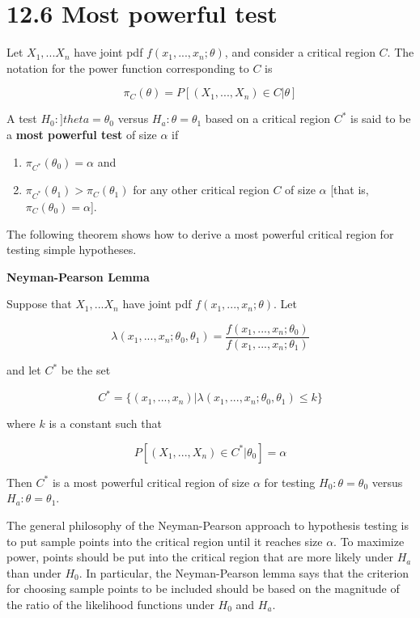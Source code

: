 \documentclass[]{book}
\begin{document}
\hypertarget{most-powerful-test}{%
\section{12.6 Most powerful test}\label{most-powerful-test}}

Let \(X_1,...X_n\) have joint pdf \(f(x_1,...,x_n; \theta)\), and consider a critical region \(C\). The notation for the power function corresponding to \(C\) is

\[\pi_C(\theta)=P[(X_1,...,X_n)\in C |\theta ]\]

A test \(H_0: ]theta =\theta_0\) versus \(H_a:\theta=\theta_1\) based on a critical region \(C^*\) is said to be a \textbf{most powerful test} of size \(\alpha\) if

\begin{enumerate}
\def\labelenumi{(\arabic{enumi})}
\item
  \(\pi_{C^*}(\theta_0)=\alpha\) and
\item
  \(\pi_{C^*}(\theta_1)> \pi_{C}(\theta_1)\) for any other critical region \(C\) of size \(\alpha\) {[}that is, \(\pi_{C}(\theta_0)=\alpha\){]}.
\end{enumerate}

The following theorem shows how to derive a most powerful critical region for testing simple hypotheses.

\textbf{Neyman-Pearson Lemma}

Suppose that \(X_1,...X_n\) have joint pdf \(f(x_1,...,x_n; \theta)\). Let

\[\lambda(x_1,...,x_n; \theta_0,\theta_1)=\frac{f(x_1,...,x_n; \theta_0)}{f(x_1,...,x_n; \theta_1)}\]

and let \(C^*\) be the set

\[C^*=\{(x_1,...,x_n)|\lambda(x_1,...,x_n; \theta_0,\theta_1)\leq k \}\]

where \(k\) is a constant such that

\[P[(X_1,...,X_n) \in C^*|\theta_0]=\alpha\]

Then \(C^*\) is a most powerful critical region of size \(\alpha\) for testing \(H_0: \theta=\theta_0\) versus \(H_a:\theta=\theta_1\).

The general philosophy of the Neyman-Pearson approach to hypothesis testing is to put sample points into the critical region until it reaches size \(\alpha\). To maximize power, points should be put into the critical region that are more likely under \(H_a\) than under \(H_0\). In particular, the Neyman-Pearson lemma says that the criterion for choosing sample points to be included should be based on the magnitude of the ratio of the likelihood functions under \(H_0\) and \(H_a\).
\end{document}

